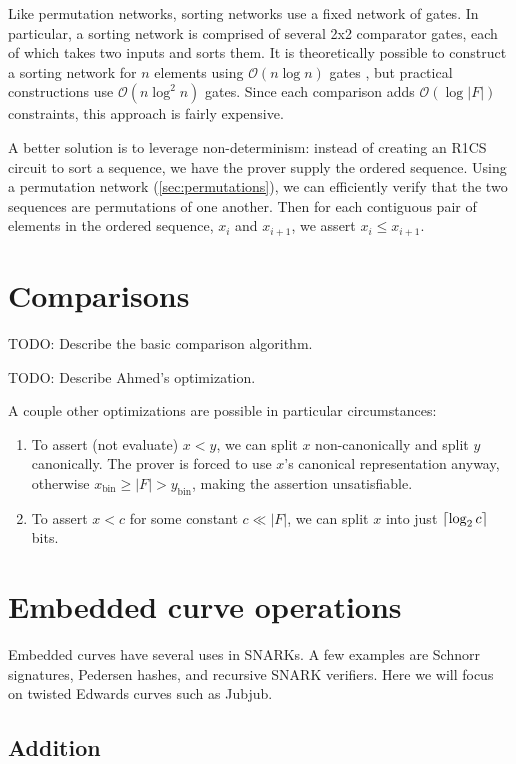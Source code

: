 \documentclass{article}
\DeclarePairedDelimiter\ceil{\lceil}{\rceil}
\begin{document}
Like permutation networks, sorting networks use a fixed network of gates. In particular, a sorting network is comprised of several 2x2 comparator gates, each of which takes two inputs and sorts them. It is theoretically possible to construct a sorting network for $n$ elements using $\mathcal{O}(n \log n)$ gates \cite{ajtai19830}, but practical constructions use $\mathcal{O}(n \log^2 n)$ gates. Since each comparison adds $\mathcal{O}(\log |F|)$ constraints, this approach is fairly expensive.

A better solution is to leverage non-determinism: instead of creating an R1CS circuit to sort a sequence, we have the prover supply the ordered sequence. Using a permutation network (\autoref{sec:permutations}), we can efficiently verify that the two sequences are permutations of one another. Then for each contiguous pair of elements in the ordered sequence, $x_i$ and $x_{i + 1}$, we assert $x_i \le x_{i + 1}$.


\section{Comparisons} \label{sec:comparisons}

TODO: Describe the basic comparison algorithm.

TODO: Describe Ahmed's optimization.

A couple other optimizations are possible in particular circumstances:
\begin{enumerate}
  \item To assert (not evaluate) $x < y$, we can split $x$ non-canonically and split $y$ canonically. The prover is forced to use $x$'s canonical representation anyway, otherwise $x_\mathrm{bin} \ge |F| > y_\mathrm{bin}$, making the assertion unsatisfiable.
  \item To assert $x < c$ for some constant $c \ll |F|$, we can split $x$ into just $\ceil{\log_2 c}$ bits.
\end{enumerate}


\section{Embedded curve operations}

Embedded curves have several uses in SNARKs. A few examples are Schnorr signatures, Pedersen hashes, and recursive SNARK verifiers.
Here we will focus on twisted Edwards curves such as Jubjub.


\subsection{Addition}
\end{document}
